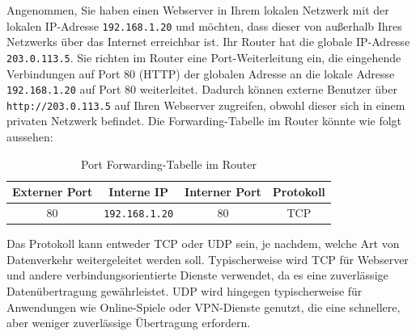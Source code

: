 \begin{myexample}
Angenommen, Sie haben einen Webserver in Ihrem lokalen Netzwerk mit der lokalen \gls{IP}-Adresse \texttt{192.168.1.20} und möchten, dass dieser von außerhalb Ihres Netzwerks über das Internet erreichbar ist. Ihr Router hat die globale \gls{IP}-Adresse \texttt{203.0.113.5}. Sie richten im Router eine Port-Weiterleitung ein, die eingehende Verbindungen auf Port 80 (\gls{HTTP}) der globalen Adresse an die lokale Adresse \texttt{192.168.1.20} auf Port 80 weiterleitet. Dadurch können externe Benutzer über \texttt{http://203.0.113.5} auf Ihren Webserver zugreifen, obwohl dieser sich in einem privaten Netzwerk befindet. Die Forwarding-Tabelle im Router könnte wie folgt aussehen:
\begin{table}[H]
	\centering
	\begin{tabular}{c|c|c|c}
		\textbf{Externer Port} & \textbf{Interne IP} & \textbf{Interner Port} & \textbf{Protokoll} \\
		\midrule\midrule
		80 & \texttt{192.168.1.20} & 80 & \gls{TCP} \\
	\end{tabular}
	\caption{Port Forwarding-Tabelle im Router}
\end{table}

Das Protokoll kann entweder \gls{TCP} oder \gls{UDP} sein, je nachdem, welche Art von Datenverkehr weitergeleitet werden soll. Typischerweise wird \gls{TCP} für Webserver und andere verbindungsorientierte Dienste verwendet, da es eine zuverlässige Datenübertragung gewährleistet. \gls{UDP} wird hingegen typischerweise für Anwendungen wie Online-Spiele oder \gls{VPN}-Dienste genutzt, die eine schnellere, aber weniger zuverlässige Übertragung erfordern.
\end{myexample}